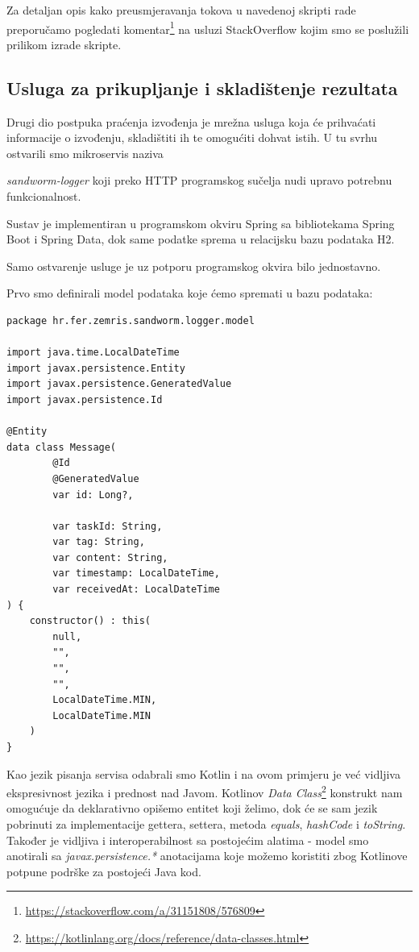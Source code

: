 \documentclass[times, utf8, zavrsni]{fer}
\begin{document}
Za detaljan opis kako preusmjeravanja tokova u navedenoj skripti rade preporučamo pogledati komentar{\footnote{\url{https://stackoverflow.com/a/31151808/576809}}} na usluzi StackOverflow kojim smo se poslužili prilikom izrade skripte.

\subsection{Usluga za prikupljanje i skladištenje rezultata}

Drugi dio postpuka praćenja izvođenja je mrežna usluga koja će prihvaćati informacije o izvođenju, skladištiti ih te omogućiti dohvat istih. U tu svrhu ostvarili smo mikroservis naziva {\textit{sandworm-logger} koji preko HTTP programskog sučelja nudi upravo potrebnu funkcionalnost.

Sustav je implementiran u programskom okviru Spring sa bibliotekama Spring Boot i Spring Data, dok same podatke sprema u relacijsku bazu podataka H2.

Samo ostvarenje usluge je uz potporu programskog okvira bilo jednostavno.

Prvo smo definirali model podataka koje ćemo spremati u bazu podataka:

\begin{lstlisting}
package hr.fer.zemris.sandworm.logger.model

import java.time.LocalDateTime
import javax.persistence.Entity
import javax.persistence.GeneratedValue
import javax.persistence.Id

@Entity
data class Message(
        @Id
        @GeneratedValue
        var id: Long?,

        var taskId: String,
        var tag: String,
        var content: String,
        var timestamp: LocalDateTime,
        var receivedAt: LocalDateTime
) {
    constructor() : this(
	 	null,
		"",
		"",
		"",
		LocalDateTime.MIN,
		LocalDateTime.MIN
	)
}
\end{lstlisting}

Kao jezik pisanja servisa odabrali smo Kotlin i na ovom primjeru je već vidljiva ekspresivnost jezika i prednost nad Javom. Kotlinov {\textit{Data Class}}{\footnote{\url{https://kotlinlang.org/docs/reference/data-classes.html}}} konstrukt nam omogućuje da deklarativno opišemo entitet koji želimo, dok će se sam jezik pobrinuti za implementacije gettera, settera, metoda {\textit{equals}}, {\textit{hashCode}} i {\textit{toString}}. Također je vidljiva i interoperabilnost sa postojećim alatima - model smo anotirali sa {\textit{javax.persistence.*}} anotacijama koje možemo koristiti zbog Kotlinove potpune podrške za postojeći Java kod.


}
\end{document}
